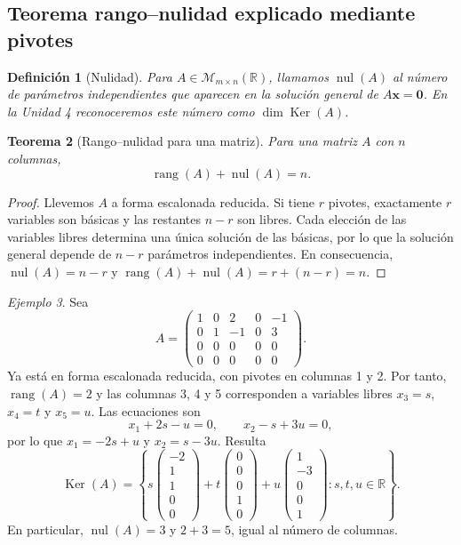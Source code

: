 \documentclass[12pt]{article}
\newtheorem{definicion}{Definición}[section]
\newtheorem{teorema}[definicion]{Teorema}
\theoremstyle{remark}
\newtheorem{ejemplo}[definicion]{Ejemplo}
\newcommand{\R}{\mathbb{R}}
\newcommand{\Mat}[2]{\mathcal{M}_{#1\times #2}}
\newcommand{\rang}{\operatorname{rang}}
\newcommand{\Ker}{\operatorname{Ker}}
\newcommand{\vect}[1]{\boldsymbol{#1}}
\begin{document}
\subsection*{Teorema rango--nulidad explicado mediante pivotes}
\begin{definicion}[Nulidad]
Para $A\in\Mat{m}{n}(\R)$, llamamos $\operatorname{nul}(A)$ al número de parámetros independientes que aparecen en la solución general de $A\vect x=\vect0$. En la Unidad 4 reconoceremos este número como $\dim\Ker(A)$.
\end{definicion}
\begin{teorema}[Rango--nulidad para una matriz]
Para una matriz $A$ con $n$ columnas,
\[
\boxed{\rang(A)+\operatorname{nul}(A)=n.}
\]
\end{teorema}
\begin{proof}
Llevemos $A$ a forma escalonada reducida. Si tiene $r$ pivotes, exactamente $r$ variables son básicas y las restantes $n-r$ son libres. Cada elección de las variables libres determina una única solución de las básicas, por lo que la solución general depende de $n-r$ parámetros independientes. En consecuencia, $\operatorname{nul}(A)=n-r$ y $\rang(A)+\operatorname{nul}(A)=r+(n-r)=n$.
\end{proof}
\begin{ejemplo}
Sea
\[
A=\begin{pmatrix}
1&0&2&0&-1\\0&1&-1&0&3\\0&0&0&0&0\\0&0&0&0&0
\end{pmatrix}.
\]
Ya está en forma escalonada reducida, con pivotes en columnas 1 y 2. Por tanto, $\rang(A)=2$ y las columnas 3, 4 y 5 corresponden a variables libres $x_3=s$, $x_4=t$ y $x_5=u$. Las ecuaciones son
\[
x_1+2s-u=0,\qquad x_2-s+3u=0,
\]
por lo que $x_1=-2s+u$ y $x_2=s-3u$. Resulta
\[
\Ker(A)=\left\{s\begin{pmatrix}-2\\1\\1\\0\\0\end{pmatrix}
+t\begin{pmatrix}0\\0\\0\\1\\0\end{pmatrix}
+u\begin{pmatrix}1\\-3\\0\\0\\1\end{pmatrix}:s,t,u\in\R\right\}.
\]
En particular, $\operatorname{nul}(A)=3$ y $2+3=5$, igual al número de columnas.
\end{ejemplo}
\end{document}
